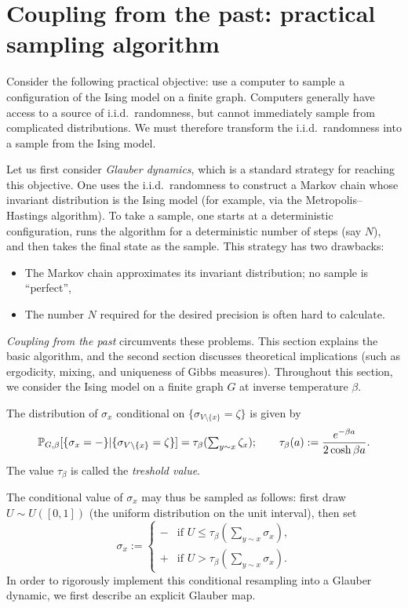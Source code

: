 \section{Coupling from the past: practical sampling algorithm}

Consider the following practical objective:
use a computer to sample a configuration of the Ising model on a finite graph.
Computers generally have access to a source of i.i.d.\ randomness,
but cannot immediately sample from complicated distributions.
We must therefore transform the i.i.d.\ randomness
into a sample from the Ising model.

Let us first consider \emph{Glauber dynamics},
which is a standard strategy for reaching this objective.
One uses the i.i.d.\ randomness
to construct a Markov chain whose invariant distribution is the Ising model
(for example, via the Metropolis--Hastings algorithm).
To take a sample, one starts at a deterministic configuration, runs the algorithm for a deterministic number of steps (say $N$),
and then takes the final state as the sample.
This strategy has two drawbacks:
\begin{itemize}
    \item The Markov chain approximates its invariant distribution;
    no sample is ``perfect'',
    \item The number $N$ required for the desired precision is often hard to calculate.
\end{itemize}

\emph{Coupling from the past} circumvents these problems.
This section explains the basic algorithm,
and the second section discusses theoretical implications (such as ergodicity, mixing, and uniqueness of Gibbs measures).
Throughout this section, we consider the Ising model
on a finite graph $G$ at inverse temperature $\beta$.

\begin{definition}
    The distribution of $\sigma_x$ conditional on $\{\sigma_{V\setminus\{x\}}=\zeta\}$ is given by
    \[
        \P_{G,\beta}[\{\sigma_x=-\}|\{\sigma_{V\setminus\{x\}}=\zeta\}]
        =
        \tau_\beta({\textstyle\sum_{y\sim x}\zeta_x});
        \qquad
        \tau_\beta(a):=\frac{e^{-\beta a}}{2\cosh\beta a}.
    \]
    The value $\tau_\beta$ is called the \emph{treshold value}.
\end{definition}

The conditional value of $\sigma_x$ may thus be sampled as follows:
first draw $U\sim U([0,1])$ (the uniform distribution on the unit interval),
then set
\[
    \sigma_x:=\begin{cases}
        - &\text{if $U\leq \tau_\beta(\sum_{y\sim x}\sigma_x)$,}\\
        + &\text{if $U> \tau_\beta(\sum_{y\sim x}\sigma_x)$.}
    \end{cases}
\]
In order to rigorously implement this conditional resampling into a Glauber dynamic,
we first describe an explicit Glauber map.

